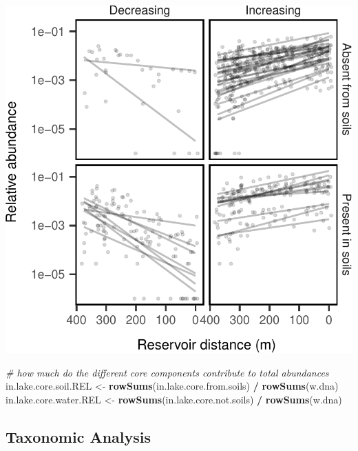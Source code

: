 \documentclass[]{article}
\newenvironment{Shaded}{\begin{snugshade}}{\end{snugshade}}
\newcommand{\KeywordTok}[1]{\textcolor[rgb]{0.13,0.29,0.53}{\textbf{#1}}}
\newcommand{\StringTok}[1]{\textcolor[rgb]{0.31,0.60,0.02}{#1}}
\newcommand{\CommentTok}[1]{\textcolor[rgb]{0.56,0.35,0.01}{\textit{#1}}}
\newcommand{\OperatorTok}[1]{\textcolor[rgb]{0.81,0.36,0.00}{\textbf{#1}}}
\newcommand{\NormalTok}[1]{#1}
\begin{document}
\begin{center}\includegraphics{ReservoirGradient_files/figure-latex/sig_taxa-1} \end{center}

\begin{Shaded}
\begin{Highlighting}[]
\CommentTok{# how much do the different core components contribute to total abundances}
\NormalTok{in.lake.core.soil.REL <-}\StringTok{ }\KeywordTok{rowSums}\NormalTok{(in.lake.core.from.soils) }\OperatorTok{/}\StringTok{ }\KeywordTok{rowSums}\NormalTok{(w.dna)}
\NormalTok{in.lake.core.water.REL <-}\StringTok{ }\KeywordTok{rowSums}\NormalTok{(in.lake.core.not.soils) }\OperatorTok{/}\StringTok{ }\KeywordTok{rowSums}\NormalTok{(w.dna)}
\end{Highlighting}
\end{Shaded}

\subsection{Taxonomic Analysis}\label{taxonomic-analysis}
\end{document}

